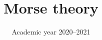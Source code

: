 \documentclass[working]{tuftebook}
\title{Morse theory}
\date{Academic year 2020--2021}
\begin{document}
    \renewcommand{\thepage}{\roman{page}}
    
    \cleardoublepage
    \maketitle
    
    \listofsymbols
    \tableofcontents
    \cleardoublepage
    \pagestyle{fancy}
    \renewcommand{\thepage}{\arabic{page}}
    \setcounter{page}{1}
    

    \printbibliography
\end{document}
